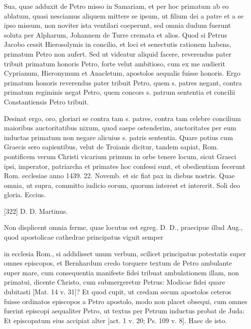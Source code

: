 Sua, quae adduxit de Petro misso in Samariam, et per hoc primatum ab eo ablatum, quasi nesciamus aliquem mittere se ipsum, ut filium dei a patre et a se ipso missum, non noviter ista ventilari coeperunt, sed omnia dudum fuerunt soluta per Alpharum, Johannem de Turre cremata et alios. Quod si Petrus Jacobo cessit Hierosolymis in concilio, et loci et senectutis rationem habens, primatum Petro non aufert. Sed ut videatur aliquid facere, reverendus pater tribuit primatum honoris Petro, forte velut ambitioso, cum ex me audierit Cyprianum, Hieronymum et Anacletum, apostolos aequalis fuisse honoris. Ergo primatum honoris reverendus pater tribuit Petro, quem s. patres negant, contra primatum regiminis negat Petro, quem concors s. patrum sententia et concilii Constantiensis Petro tribuit.

Desinat ergo, oro, gloriari se contra tam s. patres, contra tam celebre concilium maioribus auctoritatibus nixum, quod saepe ostenderim, auctoritates per eum inductas primatum non negare alicuius s. patris sententia. Quare potius cum Graecis sero sapientibus, velut de Troianis dicitur, tandem sapiat, Rom. pontificem verum Christi vicarium primum in orbe tenere locum, sicut Graeci ipsi, imperator, patriarcha et primates hoc confessi sunt, et obedientiam fecerunt Rom. ecclesiae anno 1439. 22. Novemb. et sic fiat pax in diebus nostris. Quae omnia, ut supra, committo iudicio eorum, quorum interest et intererit. Soli deo gloria. Eccius.

[322] D. D. Martinus.

Non displicent omnia ferme, quae locutus est egreg. D. D., praecipue illud Aug., quod apostolicae cathedrae principatus viguit semper

in ecclesia Rom., si addidisset unum verbum, scilicet principatus potestatis super omnes episcopos, et Bernhardum credo torquere textum de Petro ambulante super mare, cum consequentia manifeste fidei tribuat ambulationem illam, non primatui, dicente Christo, cum submergeretur Petrus: Modicae fidei quare dubitasti [Mat. 14 v. 31]? Et quod cupit, ut credam secum apostolos ceteros fuisse ordinatos episcopos a Petro apostolo, modo non placet obsequi, cum omnes fuerint episcopi aequaliter Petro, ut textus per Petrum inductus probat de Juda: Et episcopatum eius accipiat alter [act. 1 v. 20; Ps. 109 v. 8]. Haec de isto.

